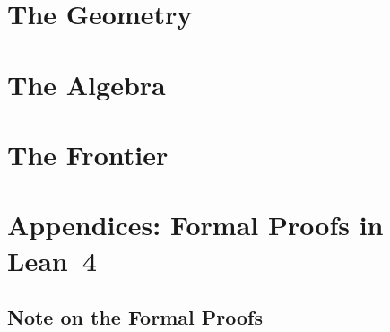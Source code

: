 \documentclass[11pt,openright,twoside]{book}
\begin{document}
\part{The Geometry}
\label{part:geometry}

\cleardoublepage
\cleardoublepage
\cleardoublepage
\cleardoublepage

\part{The Algebra}
\label{part:algebra}

\cleardoublepage
\cleardoublepage
\cleardoublepage
\cleardoublepage

\part{The Frontier}
\label{part:frontier}

\cleardoublepage
\cleardoublepage
\cleardoublepage
\cleardoublepage


\cleardoublepage

\backmatter

\appendix
\part*{Appendices: Formal Proofs in Lean~4}

\chapter*{Note on the Formal Proofs}
\end{document}
